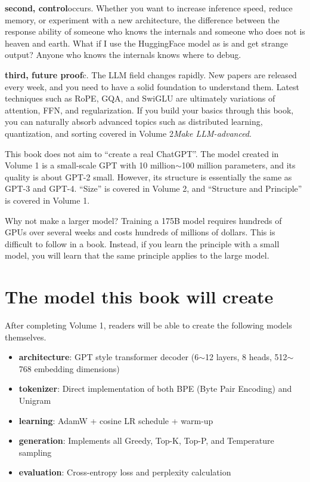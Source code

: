 \textbf{second, control}occurs. Whether you want to increase inference speed, reduce memory, or experiment with a new architecture, the difference between the response ability of someone who knows the internals and someone who does not is heaven and earth. What if I use the HuggingFace model as is and get strange output? Anyone who knows the internals knows where to debug.

\textbf{third, future proof}c. The LLM field changes rapidly. New papers are released every week, and you need to have a solid foundation to understand them. Latest techniques such as RoPE, GQA, and SwiGLU are ultimately variations of attention, FFN, and regularization. If you build your basics through this book, you can naturally absorb advanced topics such as distributed learning, quantization, and sorting covered in Volume 2\textit{Make LLM-advanced}.

\begin{warnbox}
This book does not aim to ``create a real ChatGPT''. The model created in Volume 1 is a small-scale GPT with 10 million$\sim$100 million parameters, and its quality is about GPT-2 small. However, its structure is essentially the same as GPT-3 and GPT-4. ``Size'' is covered in Volume 2, and ``Structure and Principle'' is covered in Volume 1.

Why not make a larger model? Training a 175B model requires hundreds of GPUs over several weeks and costs hundreds of millions of dollars. This is difficult to follow in a book. Instead, if you learn the principle with a small model, you will learn that the same principle applies to the large model.
\end{warnbox}

\section{The model this book will create}

After completing Volume 1, readers will be able to create the following models themselves.

\begin{itemize}
\item\textbf{architecture}: GPT style transformer decoder (6$\sim$12 layers, 8 heads, 512$\sim$768 embedding dimensions)
\item\textbf{tokenizer}: Direct implementation of both BPE (Byte Pair Encoding) and Unigram
\item\textbf{learning}: AdamW + cosine LR schedule + warm-up
\item\textbf{generation}: Implements all Greedy, Top-K, Top-P, and Temperature sampling
\item\textbf{evaluation}: Cross-entropy loss and perplexity calculation
\end{itemize}


